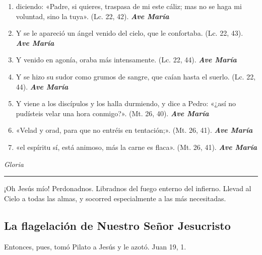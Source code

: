 \documentclass[a4paper,11pt, oneside]{report}
\begin{document}
{{\begin{enumerate}
        \item diciendo: «Padre, si quieres, traspasa de mi este cáliz; mas no se haga mi voluntad, sino la tuya». (Lc. 22, 42). \textbf{\textit{Ave María}}

        \item Y se le apareció un ángel venido del cielo, que le confortaba. (Lc. 22, 43). \textbf{\textit{Ave María}}

        \item Y venido en agonía, oraba más intensamente. (Lc. 22, 44). \textbf{\textit{Ave María}}

        \item Y se hizo su sudor como grumos de sangre, que caían hasta el suerlo. (Lc. 22, 44). \textbf{\textit{Ave María}}

        \item Y viene a los discípulos y los halla durmiendo, y dice a Pedro: «¿así no pudísteis velar una hora conmigo?». (Mt. 26, 40). \textbf{\textit{Ave María}}

        \item «Velad y orad, para que no entréis en tentación;». (Mt. 26, 41). \textbf{\textit{Ave María}}

        \item «el espíritu sí, está animoso, más la carne es flaca». (Mt. 26, 41). \textbf{\textit{Ave María}}

      \end{enumerate}

      \indent\textit{Gloria} \par

      \begin{center}\rule{1\linewidth}{\linethickness}\end{center}
      
      \medskip
      \hypertarget{finalHuerto}{¡Oh Jesús mío! Perdonadnos. Libradnos del fuego enterno del infierno. Llevad al Cielo a todas las almas, y socorred especialmente a las más 
      necesitadas.}
    }  
  
  \subsection*{La flagelación de Nuestro Señor Jesucristo}
    { 
      
      Entonces, pues, tomó Pilato a Jesús y le azotó. Juan 19, 1.
          
}}
\end{document}
